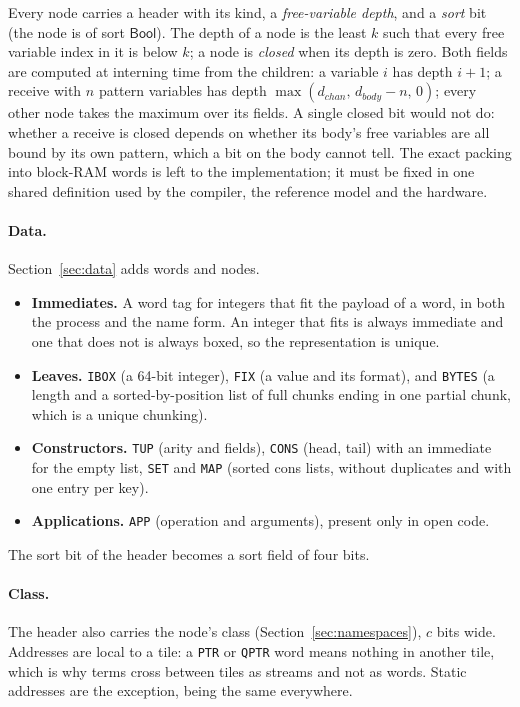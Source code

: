 \documentclass[11pt]{article}
\newcommand{\kw}[1]{\texttt{#1}}
\theoremstyle{definition}
\theoremstyle{remark}
\begin{document}
\medskip\noindent
Every node carries a header with its kind, a \emph{free-variable depth}, and
a \emph{sort} bit (the node is of sort $\mathsf{Bool}$). The depth of a node
is the least $k$ such that every free variable index in it is below $k$; a
node is \emph{closed} when its depth is zero. Both fields are computed at
interning time from the children: a variable $i$ has depth $i+1$; a receive
with $n$ pattern variables has depth $\max(d_{\mathit{chan}},\, d_{\mathit{body}}-n,\, 0)$;
every other node takes the maximum over its fields. A single closed bit would
not do: whether a receive is closed depends on whether its body's free
variables are all bound by its own pattern, which a bit on the body cannot
tell. The exact packing into block-RAM words is left to the
implementation; it must be fixed in one shared definition used by the
compiler, the reference model and the hardware.

\paragraph{Data.} Section~\ref{sec:data} adds words and nodes.
\begin{itemize}
\item \textbf{Immediates.} A word tag for integers that fit the payload of a
word, in both the process and the name form. An integer that fits is always
immediate and one that does not is always boxed, so the representation is
unique.
\item \textbf{Leaves.} \kw{IBOX} (a 64-bit integer), \kw{FIX} (a value and
its format), and \kw{BYTES} (a length and a sorted-by-position list of full
chunks ending in one partial chunk, which is a unique chunking).
\item \textbf{Constructors.} \kw{TUP} (arity and fields), \kw{CONS} (head,
tail) with an immediate for the empty list, \kw{SET} and \kw{MAP} (sorted
cons lists, without duplicates and with one entry per key).
\item \textbf{Applications.} \kw{APP} (operation and arguments), present only
in open code.
\end{itemize}
The sort bit of the header becomes a sort field of four bits.

\paragraph{Class.} The header also carries the node's class
(Section~\ref{sec:namespaces}), $c$ bits wide. Addresses are local to a tile:
a \kw{PTR} or \kw{QPTR} word means nothing in another tile, which is why
terms cross between tiles as streams and not as words. Static addresses are
the exception, being the same everywhere.
\end{document}
